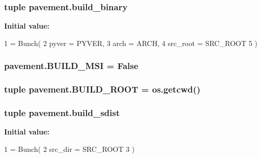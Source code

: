 \subsubsection[{build\+\_\+binary}]{\setlength{\rightskip}{0pt plus 5cm}tuple pavement.\+build\+\_\+binary}\label{namespacepavement_a532e8b94130cb5287bc214b21aae0198}
{\bfseries Initial value\+:}
\begin{DoxyCode}
1 = Bunch(
2         pyver = PYVER,
3         arch = ARCH,
4         src\_root = SRC\_ROOT
5     )
\end{DoxyCode}
\hypertarget{namespacepavement_aa417dc73ad8dee68e880e84da3f7afc7}{}
\subsubsection[{B\+U\+I\+L\+D\+\_\+\+M\+S\+I}]{\setlength{\rightskip}{0pt plus 5cm}pavement.\+B\+U\+I\+L\+D\+\_\+\+M\+S\+I = {\bf False}}\label{namespacepavement_aa417dc73ad8dee68e880e84da3f7afc7}
\hypertarget{namespacepavement_a61828f3c20b7f24bfc0770533ac77c69}{}
\subsubsection[{B\+U\+I\+L\+D\+\_\+\+R\+O\+O\+T}]{\setlength{\rightskip}{0pt plus 5cm}tuple pavement.\+B\+U\+I\+L\+D\+\_\+\+R\+O\+O\+T = os.\+getcwd()}\label{namespacepavement_a61828f3c20b7f24bfc0770533ac77c69}
\hypertarget{namespacepavement_af47ce1886b9730a3f237f22147cdba3e}{}
\subsubsection[{build\+\_\+sdist}]{\setlength{\rightskip}{0pt plus 5cm}tuple pavement.\+build\+\_\+sdist}\label{namespacepavement_af47ce1886b9730a3f237f22147cdba3e}
{\bfseries Initial value\+:}
\begin{DoxyCode}
1 = Bunch(
2         src\_dir = SRC\_ROOT
3     )
\end{DoxyCode}
\hypertarget{namespacepavement_a522eb2426d7492ec5e58f9d33c57383b}{}
